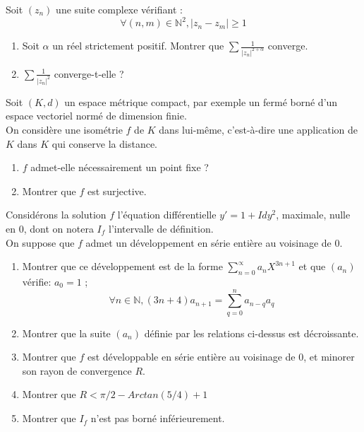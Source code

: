 \begin{exer}
Soit $(z_n)$ une suite complexe vérifiant :
\[\forall (n,m) \in \mathbb{N}^2 , \lvert z_n - z_m \rvert \geq 1\]
\begin{enumerate}
\item Soit $\alpha$ un réel strictement positif. Montrer que $\sum \frac{1}{\lvert z_n \rvert^{2 + \alpha}}$ converge.
\item $\sum \frac{1}{\lvert z_n \rvert^2}$ converge-t-elle ?
\end{enumerate}
\end{exer}

\begin{exer}
Soit $(K,d)$ un espace métrique compact, par exemple un fermé borné d'un espace vectoriel normé de dimension finie.\\
On considère une isométrie $f$ de $K$ dans lui-même, c'est-à-dire une application de $K$ dans $K$ qui conserve la distance.
\begin{enumerate}
\item $f$ admet-elle nécessairement un point fixe ?
\item Montrer que $f$ est surjective.
\end{enumerate}
\end{exer}

\begin{exer}
Considérons la solution $f$ l'équation différentielle $y'=1+Idy^{2}$, maximale, nulle en $0$, %
dont on notera $I_{f}$ l'intervalle de définition.\\
On suppose que $f$ admet un développement en série entière au voisinage de $0$.
\begin{enumerate}
\item Montrer que ce développement est de la forme $\sum_{n=0}^{\propto} a_{n}X^{3n+1}$ et que $(a_{n})$ vérifie:
$a_{0}=1$ ; \[\forall n \in \mathbb{N}, (3n+4)a_{n+1}=\sum_{q=0}^{n} a_{n-q}a_{q}\]
\item Montrer que la suite $(a_{n})$ définie par les relations ci-dessus est décroissante.
\item Montrer que $f$ est développable en série entière au voisinage de $0$, et minorer son rayon de convergence $R$.
\item Montrer que $R < \pi/2 - Arctan(5/4) + 1$
\item Montrer que $I_{f}$ n'est pas borné inférieurement.
\end{enumerate}
\end{exer}

